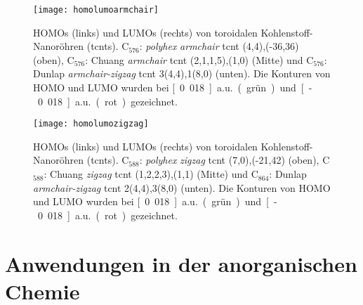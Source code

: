 \begin{figure}[ht!]
	\centering
	\texttt{[image: homolumoarmchair]}
	\captionsetup{figurewithin = chapter}
	\captionsetup{font=small, labelfont=bf}\caption[HOMO und LUMO von toroidalen Kohlenstoff-Nanoröhren 1]{HOMOs (links) und LUMOs (rechts) von toroidalen Kohlenstoff-Nanoröhren (\acp{tcnt}). C$_{576}$: \textit{polyhex} \textit{armchair} \ac{tcnt} (4,4),(-36,36) (oben), C$_{576}$: Chuang \textit{armchair} \ac{tcnt} (2,1,1,5),(1,0) (Mitte) und C$_{576}$: Dunlap \textit{armchair-zigzag} \ac{tcnt} 3(4,4),1(8,0) (unten). Die Konturen von HOMO und LUMO wurden bei \unit[0.018]{a.u.} (grün) und \unit[-0.018]{a.u.} (rot) gezeichnet.}
\label{abb:homolumoarmchair}
\end{figure}

\begin{figure}[ht!]
	\centering
	\texttt{[image: homolumozigzag]}
	\captionsetup{figurewithin = chapter}
	\captionsetup{font=small, labelfont=bf}\caption[HOMO und LUMO von toroidalen Kohlenstoff-Nanoröhren 2]{HOMOs (links) und LUMOs (rechts) von toroidalen Kohlenstoff-Nanoröhren (\acp{tcnt}). C$_{588}$: \textit{polyhex} \textit{zigzag} \ac{tcnt} (7,0),(-21,42) (oben), C$_{588}$: Chuang \textit{zigzag} \ac{tcnt} (1,2,2,3),(1,1) (Mitte) und C$_{864}$: Dunlap \textit{armchair-zigzag} \ac{tcnt} 2(4,4),3(8,0) (unten). Die Konturen von HOMO und LUMO wurden bei \unit[0.018]{a.u.} (grün) und \unit[-0.018]{a.u.} (rot) gezeichnet.}
\label{abb:homolumozigzag}
\end{figure}

\section{Anwendungen in der anorganischen Chemie}
\FloatBarrier
